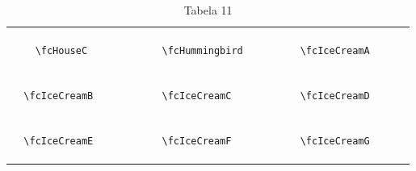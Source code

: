 \documentclass[x11names]{article}
\begin{document}
\begin{table}[H]
\begin{tabular}{|c|c|c|c|c|c|}
		&\multirow{5}{*}{	\fcHouseC	[scale=0.16]} & &\multirow{5}{*}{	\fcHummingbird	[scale=0.16]} & &\multirow{5}{*}{	\fcIceCreamA	[scale=0.16]}\\	& & & & & \\	& & & & & \\	\verb|	\fcHouseC	| & & \verb|	\fcHummingbird	| & & \verb|	\fcIceCreamA	| & \\	& & & & & \\	& & & & & \\	& & & & & \\	\hline									
		&\multirow{5}{*}{	\fcIceCreamB	[scale=0.16]} & &\multirow{5}{*}{	\fcIceCreamC	[scale=0.09]} & &\multirow{5}{*}{	\fcIceCreamD	[scale=0.09]}\\	& & & & & \\	& & & & & \\	\verb|	\fcIceCreamB	| & & \verb|	\fcIceCreamC	| & & \verb|	\fcIceCreamD	| & \\	& & & & & \\	& & & & & \\	& & & & & \\	\hline									
		&\multirow{5}{*}{	\fcIceCreamE	[scale=0.16]} & &\multirow{5}{*}{	\fcIceCreamF	[scale=0.16]} & &\multirow{5}{*}{	\fcIceCreamG	[scale=0.16]}\\	& & & & & \\	& & & & & \\	\verb|	\fcIceCreamE	| & & \verb|	\fcIceCreamF	| & & \verb|	\fcIceCreamG	| & \\	& & & & & \\	& & & & & \\	& & & & & \\		\hline 	\hline 	\end{tabular}	\caption{	Tabela 11	}\label{	Tab11	}\end{table}
\end{document}
